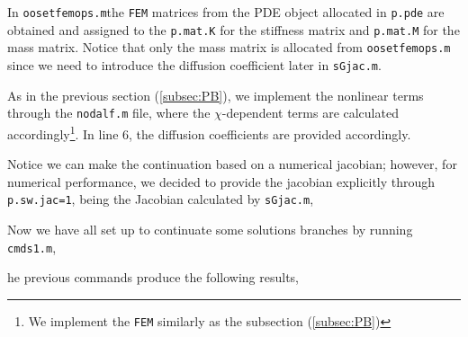 \documentclass[a4paper,12pt]{article}
\begin{document}


In {\tt oosetfemops.m}the {\tt FEM} matrices from the PDE object allocated in {\tt p.pde} are obtained and assigned to the {\tt p.mat.K} for the stiffness matrix and {\tt p.mat.M} for the mass matrix. Notice that only the mass matrix is allocated from {\tt oosetfemops.m} since we need to introduce the diffusion coefficient later in {\tt sGjac.m}.



As in the previous section (\ref{subsec:PB}), we implement the nonlinear terms through the {\tt nodalf.m} file, where the $\chi$-dependent terms are calculated accordingly\footnote{We implement the {\tt FEM} similarly as the subsection (\ref{subsec:PB})}. In line 6, the diffusion coefficients are provided accordingly. 

Notice we can make the continuation based on a numerical jacobian; however, for numerical performance, we decided to provide the jacobian explicitly through {\tt p.sw.jac=1}, being the Jacobian calculated by {\tt sGjac.m},


Now we have all set up to continuate some solutions branches by running {\tt cmds1.m},

he previous commands produce the following results,
\end{document}
